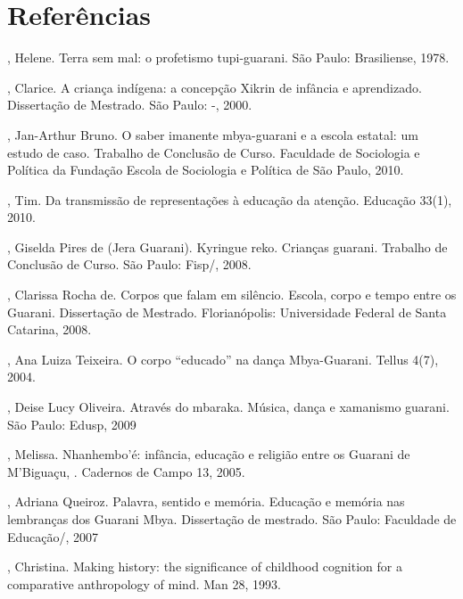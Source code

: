 \section{Referências}

\begin{Parskip}
, Helene. Terra sem mal: o profetismo tupi-guarani. São
Paulo: Brasiliense, 1978.

, Clarice. A criança indígena: a concepção Xikrin de infância
e aprendizado. Dissertação de Mestrado. São Paulo: -, 2000.

, Jan-Arthur Bruno. O saber imanente mbya-guarani e a escola
estatal: um estudo de caso. Trabalho de Conclusão de Curso. Faculdade
de Sociologia e Política da Fundação Escola de Sociologia e Política de
São Paulo, 2010.

, Tim. Da transmissão de representações à educação da
atenção. Educação 33(1), 2010.

, Giselda Pires de (Jera Guarani). Kyringue reko. Crianças
guarani. Trabalho de Conclusão de Curso. São Paulo: Fisp/, 2008.

, Clarissa Rocha de. Corpos que falam em silêncio. Escola,
corpo e tempo entre os Guarani.  Dissertação de Mestrado.
Florianópolis: Universidade Federal de Santa Catarina, 2008.

, Ana Luiza Teixeira. O corpo ``educado'' na dança
Mbya-Guarani. Tellus 4(7), 2004.

, Deise Lucy Oliveira. Através do mbaraka. Música, dança e
xamanismo guarani. São Paulo: Edusp, 2009

, Melissa.  Nhanhembo’é: infância, educação e religião
entre os Guarani de M’Biguaçu, . Cadernos de Campo 13, 2005.

, Adriana Queiroz. Palavra, sentido e memória. Educação e
memória nas lembranças dos Guarani Mbya. Dissertação de mestrado. São
Paulo: Faculdade de Educação/, 2007

, Christina. Making history: the significance of childhood
cognition for a comparative anthropology of mind. Man 28, 1993.
\end{Parskip}


